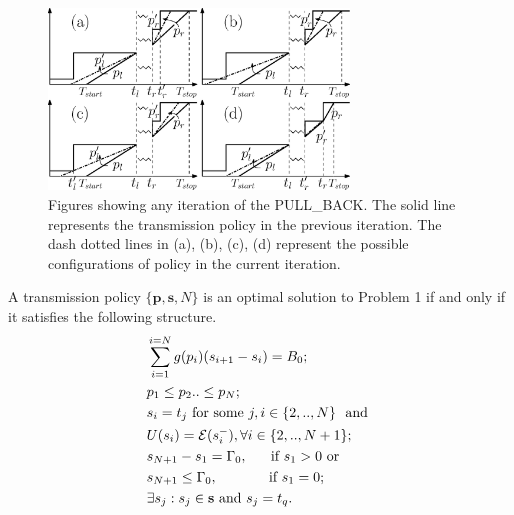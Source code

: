 \begin{figure}
\centering
  \centerline{\includegraphics[width=8cm]{Algorithm1.eps}}
\caption{Figures showing any iteration of the PULL\_BACK. The solid line represents the transmission policy in the previous iteration. The dash dotted lines in (a), (b), (c), (d) represent the possible configurations of policy in the current iteration.}\label{figure_Algorithm1}
\end{figure}
 
\begin{theorem}
A transmission policy $\{\textbf{p},\textbf{s},N\}$ is an optimal solution to Problem 1 if and only if it satisfies the following structure.
\label{th_algo1_1}
\begin{align}
&\sum_{i=1}^{i=N}g(p_i)(s_{i+1}-s_i)=B_0; 								
\label{claim1}
\\
&p_1\le p_2 ..\le p_N;
\label{claim3}  
\\
&\nonumber s_i=t_j \text{ for some } j, i\in \{2,..,N\} \ \text{ and }
\\
& U(s_i)=\ETx(s_i^-), \forall i\in \{2,..,N+1\};
\label{claim4}
\\
&\nonumber s_{N+1}-s_1=\TRx_0, 	 \ \ \ \ 						\text{ if } s_1>0 \text{ or }
\\
& s_{N+1}\le \TRx_0,				\ \ \ \ \ \ \ \ \ \				\text{ if } s_1=0;
\label{claim2}
\\
&\exists s_j:s_j\in \textbf{s} \text{ and } s_j=t_q.
\label{claim5}
\end{align}
\end{theorem}

